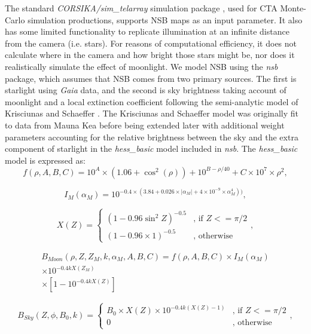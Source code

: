 The standard \textit{CORSIKA/sim\_telarray} simulation package \cite{simtel}, used for CTA Monte-Carlo simulation productions, supports NSB maps as an input parameter. It also has some limited functionality to replicate illumination at an infinite distance from the camera (i.e. stars). For reasons of computational efficiency, it does not calculate where in the camera and how bright those stars might be, nor does it realistically simulate the effect of moonlight. We model NSB using the \textit{nsb} package, which assumes that NSB comes from two primary sources. The first is starlight using \textit{Gaia} data, and the second is sky brightness taking account of moonlight and a local extinction coefficient following the semi-analytic model of Krisciunas and Schaeffer \cite{Krisciunas}. The Krisciunas and Schaeffer model was originally fit to data from Mauna Kea before being extended later with additional weight parameters accounting for the relative brightness between the sky and the extra component of starlight in the \textit{hess\_basic} model included in \textit{nsb}. The \textit{hess\_basic} model is expressed as:
\begin{equation}
    f(\rho, A, B, C) = 10^{A}\times (1.06+\cos^2(\rho))+10^{B-\rho/40}+C \times 10^7 \times \rho^2,
\end{equation}

\begin{equation}
    I_{M} (\alpha_{M}) = 10^{-0.4 \times (3.84 + 0.026 \times |\alpha_{M}| + 4 \times 10^{-9} \times \alpha_{M}^4))},
\end{equation}

\begin{equation}
    X(Z)=\begin{cases} (1-0.96\sin^2 Z)^{-0.5} & \mbox{, if }  Z<=\pi/2 \\ (1 - 0.96 \times 1)^{-0.5} & \mbox{, otherwise } \end{cases},
\end{equation}

\begin{equation}
\begin{aligned}
    B_{Moon}(\rho,Z,Z_{M},k,\alpha_{M},A,B,C)=f(\rho,A,B,C) \times I_{M}(\alpha_{M}) \\ \times 10^{-0.4kX(Z_{M})}\\ \times [1-10^{-0.4 k X(Z)}]
\end{aligned}
\end{equation}

\begin{equation}
    B_{Sky}(Z,\phi,B_0,k)=\begin{cases} B_0\times X(Z) \times 10^{-0.4k(X(Z)-1)} & \mbox{, if }  Z<=\pi/2 \\ 0 & \mbox{, otherwise } \end{cases},
\end{equation}

